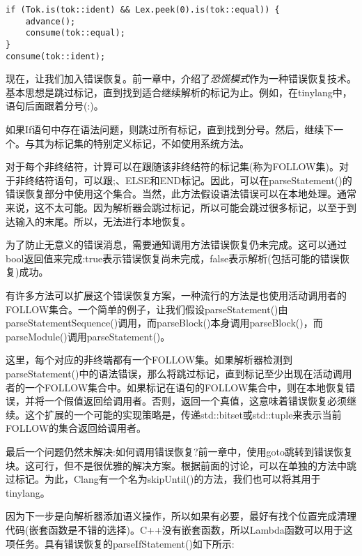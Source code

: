 \begin{lstlisting}[caption={}]
if (Tok.is(tok::ident) && Lex.peek(0).is(tok::equal)) {
	advance();
	consume(tok::equal);
}
consume(tok::ident);
\end{lstlisting}

现在，让我们加入错误恢复。前一章中，介绍了\textit{恐慌模式}作为一种错误恢复技术。基本思想是跳过标记，直到找到适合继续解析的标记为止。例如，在tinylang中，语句后面跟着分号(:)。\par

如果If语句中存在语法问题，则跳过所有标记，直到找到分号。然后，继续下一个。与其为标记集的特别定义标记，不如使用系统方法。\par

对于每个非终结符，计算可以在跟随该非终结符的标记集(称为FOLLOW集)。对于非终结符语句，可以跟;、ELSE和END标记。因此，可以在parseStatement()的错误恢复部分中使用这个集合。当然，此方法假设语法错误可以在本地处理。通常来说，这不太可能。因为解析器会跳过标记，所以可能会跳过很多标记，以至于到达输入的末尾。所以，无法进行本地恢复。\par

为了防止无意义的错误消息，需要通知调用方法错误恢复仍未完成。这可以通过bool返回值来完成:true表示错误恢复尚未完成，false表示解析(包括可能的错误恢复)成功。\par

有许多方法可以扩展这个错误恢复方案，一种流行的方法是也使用活动调用者的FOLLOW集合。一个简单的例子，让我们假设parseStatement()由parseStatementSequence()调用，而parseBlock()本身调用parseBlock()，而parseModule()调用parseStatement()。\par

这里，每个对应的非终端都有一个FOLLOW集。如果解析器检测到parseStatement()中的语法错误，那么将跳过标记，直到标记至少出现在活动调用者的一个FOLLOW集合中。如果标记在语句的FOLLOW集合中，则在本地恢复错误，并将一个假值返回给调用者。否则，返回一个真值，这意味着错误恢复必须继续。这个扩展的一个可能的实现策略是，传递std::bitset或std::tuple来表示当前FOLLOW的集合返回给调用者。\par

最后一个问题仍然未解决:如何调用错误恢复?前一章中，使用goto跳转到错误恢复块。这可行，但不是很优雅的解决方案。根据前面的讨论，可以在单独的方法中跳过标记。为此，Clang有一个名为skipUntil()的方法，我们也可以将其用于tinylang。\par

因为下一步是向解析器添加语义操作，所以如果有必要，最好有找个位置完成清理代码(嵌套函数是不错的选择)。C++没有嵌套函数，所以Lambda函数可以用于这项任务。具有错误恢复的parseIfStatement()如下所示:\par

